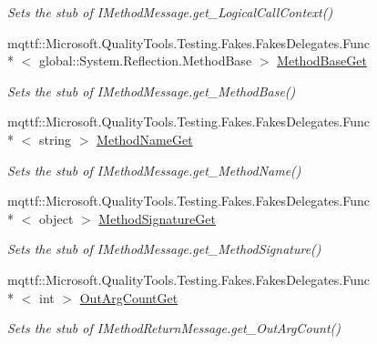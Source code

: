 \begin{DoxyCompactItemize}
\begin{DoxyCompactList}\small\item\em Sets the stub of I\-Method\-Message.\-get\-\_\-\-Logical\-Call\-Context()\end{DoxyCompactList}\item 
mqttf\-::\-Microsoft.\-Quality\-Tools.\-Testing.\-Fakes.\-Fakes\-Delegates.\-Func\\*
$<$ global\-::\-System.\-Reflection.\-Method\-Base $>$ \hyperlink{class_system_1_1_runtime_1_1_remoting_1_1_messaging_1_1_fakes_1_1_stub_i_method_return_message_af3206f2a8a3172be2309c66e6f7100be}{Method\-Base\-Get}
\begin{DoxyCompactList}\small\item\em Sets the stub of I\-Method\-Message.\-get\-\_\-\-Method\-Base()\end{DoxyCompactList}\item 
mqttf\-::\-Microsoft.\-Quality\-Tools.\-Testing.\-Fakes.\-Fakes\-Delegates.\-Func\\*
$<$ string $>$ \hyperlink{class_system_1_1_runtime_1_1_remoting_1_1_messaging_1_1_fakes_1_1_stub_i_method_return_message_a5e3ffc7880fad625664a777a907ec7fb}{Method\-Name\-Get}
\begin{DoxyCompactList}\small\item\em Sets the stub of I\-Method\-Message.\-get\-\_\-\-Method\-Name()\end{DoxyCompactList}\item 
mqttf\-::\-Microsoft.\-Quality\-Tools.\-Testing.\-Fakes.\-Fakes\-Delegates.\-Func\\*
$<$ object $>$ \hyperlink{class_system_1_1_runtime_1_1_remoting_1_1_messaging_1_1_fakes_1_1_stub_i_method_return_message_a9ddd64da6023d1409d08de310eff094e}{Method\-Signature\-Get}
\begin{DoxyCompactList}\small\item\em Sets the stub of I\-Method\-Message.\-get\-\_\-\-Method\-Signature()\end{DoxyCompactList}\item 
mqttf\-::\-Microsoft.\-Quality\-Tools.\-Testing.\-Fakes.\-Fakes\-Delegates.\-Func\\*
$<$ int $>$ \hyperlink{class_system_1_1_runtime_1_1_remoting_1_1_messaging_1_1_fakes_1_1_stub_i_method_return_message_ac7749d4834f325468f8e992dbf32dd07}{Out\-Arg\-Count\-Get}
\begin{DoxyCompactList}\small\item\em Sets the stub of I\-Method\-Return\-Message.\-get\-\_\-\-Out\-Arg\-Count()\end{DoxyCompactList}\item 

\end{DoxyCompactItemize}
